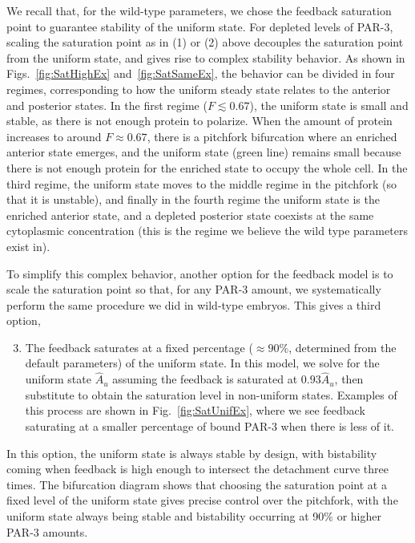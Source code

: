 \documentclass[11pt]{article}
\newcommand{\6}[1]{#1_{\text{6}}}
\newcommand{\3}[1]{#1_{\text{3}}}
\begin{document}
We recall that, for the wild-type parameters, we chose the feedback saturation point to guarantee stability of the uniform state. For depleted levels of PAR-3, scaling the saturation point as in (1) or (2) above decouples the saturation point from the uniform state, and gives rise to complex stability behavior. As shown in Figs.\ \ref{fig:SatHighEx} and\ \ref{fig:SatSameEx}, the behavior can be divided in four regimes, corresponding to how the uniform steady state relates to the anterior and posterior states. In the first regime ($F \lesssim 0.67$), the uniform state is small and stable, as there is not enough protein to polarize. When the amount of protein increases to around $F \approx 0.67$, there is a pitchfork bifurcation where an enriched anterior state emerges, and the uniform state (green line) remains small because there is not enough protein for the enriched state to occupy the whole cell. In the third regime, the uniform state moves to the middle regime in the pitchfork (so that it is unstable), and finally in the fourth regime the uniform state is the enriched anterior state, and a depleted posterior state coexists at the same cytoplasmic concentration (this is the regime we believe the wild type parameters exist in).

To simplify this complex behavior, another option for the feedback model is to scale the saturation point so that, for any PAR-3 amount, we systematically perform the same procedure we did in wild-type embryos. This gives a third option, 
\begin{enumerate}
  \setcounter{enumi}{2}
\item The feedback saturates at a fixed percentage ($\approx 90\%$, determined from the default parameters) of the uniform state. In this model, we solve for the uniform state $\hat A_u$ assuming the feedback is saturated at $0.93\hat A_u$, then substitute to obtain the saturation level in non-uniform states. Examples of this process are shown in Fig.\ \ref{fig:SatUnifEx}, where we see feedback saturating at a smaller percentage of bound PAR-3 when there is less of it. 
\end{enumerate}
In this option, the uniform state is always stable by design, with bistability coming when feedback is high enough to intersect the detachment curve three times. The bifurcation diagram shows that choosing the saturation point at a fixed level of the uniform state gives precise control over the pitchfork, with the uniform state always being stable and bistability occurring at 90\% or higher PAR-3 amounts. 
\end{document}
